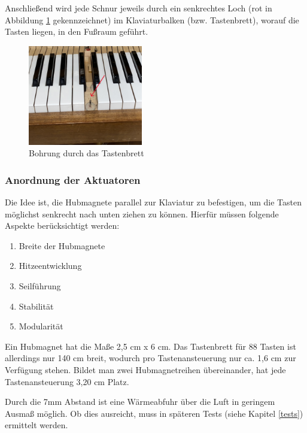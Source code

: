 Anschließend wird jede Schnur jeweils durch ein senkrechtes Loch (rot in Abbildung \ref{fig:klaviatur} gekennzeichnet) im Klaviaturbalken (bzw. Tastenbrett), %
worauf die Tasten liegen, in den Fußraum geführt.

\begin{figure}[htbp]
    \centering
    \includegraphics[width=5cm]{img/Klaviatur.jpg}
    \caption{Bohrung durch das Tastenbrett}
    \label{fig:klaviatur}
\end{figure}

\subsubsection{Anordnung der Aktuatoren}

Die Idee ist, die Hubmagnete parallel zur Klaviatur zu befestigen, um die Tasten möglichst senkrecht nach unten ziehen zu können.
Hierfür müssen folgende Aspekte berücksichtigt werden:

\begin{enumerate}
    \item Breite der Hubmagnete
    \item Hitzeentwicklung
    \item Seilführung
    \item Stabilität
    \item Modularität
\end{enumerate}

Ein Hubmagnet hat die Maße 2,5 cm x 6 cm.
Das Tastenbrett für 88 Tasten ist allerdings nur 140 cm breit, wodurch pro Tastenansteuerung nur ca. 1,6 cm zur Verfügung stehen.
Bildet man zwei Hubmagnetreihen übereinander, hat jede Tastenansteuerung 3,20 cm Platz.

Durch die 7mm Abstand ist eine Wärmeabfuhr über die Luft in geringem Ausmaß möglich.
Ob dies ausreicht, muss in späteren Tests (siehe Kapitel \ref{tests}) ermittelt werden.

